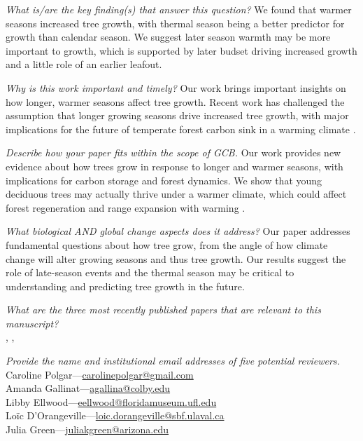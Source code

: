 \documentclass[11pt,a4paper]{article}
\begin{document}
\textit{What is/are the key finding(s) that answer this question?}
We found that warmer seasons increased tree growth, with thermal season being a better predictor for growth than calendar season. We suggest later season warmth may be more important to growth, which is supported by later budset driving increased growth and a little role of an earlier leafout.

\textit{Why is this work important and timely?}
Our work brings important insights on how longer, warmer seasons affect tree growth. Recent work has challenged the assumption that longer growing seasons drive increased tree growth, with major implications for the future of temperate forest carbon sink in a warming climate \citep{dow_warm_2022,silvestro_longer_2023,matula_shifts_2023}.  

\textit{Describe how your paper fits within the scope of GCB.}
Our work provides new evidence about how trees grow in response to longer and warmer seasons, with implications for carbon storage and forest dynamics. We show that young deciduous trees may actually thrive under a warmer climate, which could affect forest regeneration and range expansion with warming \citep{luu_importance_2024}.

\textit{What biological AND global change aspects does it address?}
Our paper addresses fundamental questions about how tree grow, from the angle of how climate change will alter growing seasons and thus tree growth. Our results suggest the role of late-season events and the thermal season may be critical to understanding and predicting tree growth in the future. 

\textit{What are the three most recently published papers that are relevant to this manuscript?}\\
\cite{dow_warm_2022}, \citep{silvestro_longer_2023}, \citep{wolkovich_why_2025}

\textit{Provide the name and institutional email addresses of five potential reviewers.} \\
Caroline Polgar---\href{mailto:carolinepolgar@gmail.com}{carolinepolgar@gmail.com} \\
Amanda Gallinat---\href{mailto:agallina@colby.edu}{agallina@colby.edu} \\
Libby Ellwood---\href{mailto:eellwood@floridamuseum.ufl.edu}{eellwood@floridamuseum.ufl.edu} \\
Loïc D'Orangeville---\href{mailto:loic.dorangeville@sbf.ulaval.ca}{loic.dorangeville@sbf.ulaval.ca} \\
Julia Green---\href{juliakgreen@arizona.edu}{juliakgreen@arizona.edu}
\end{document}
